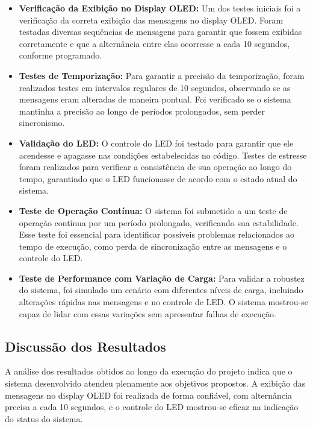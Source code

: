 \documentclass{article}
\begin{document}
\begin{itemize}
    \item \textbf{Verificação da Exibição no Display OLED:} Um dos testes iniciais foi a verificação da correta exibição das mensagens no display OLED. Foram testadas diversas sequências de mensagens para garantir que fossem exibidas corretamente e que a alternância entre elas ocorresse a cada 10 segundos, conforme programado.
    
    \item \textbf{Testes de Temporização:} Para garantir a precisão da temporização, foram realizados testes em intervalos regulares de 10 segundos, observando se as mensagens eram alteradas de maneira pontual. Foi verificado se o sistema mantinha a precisão ao longo de períodos prolongados, sem perder sincronismo.
    
    \item \textbf{Validação do LED:} O controle do LED foi testado para garantir que ele acendesse e apagasse nas condições estabelecidas no código. Testes de estresse foram realizados para verificar a consistência de sua operação ao longo do tempo, garantindo que o LED funcionasse de acordo com o estado atual do sistema.
    
    \item \textbf{Teste de Operação Contínua:} O sistema foi submetido a um teste de operação contínua por um período prolongado, verificando sua estabilidade. Esse teste foi essencial para identificar possíveis problemas relacionados ao tempo de execução, como perda de sincronização entre as mensagens e o controle do LED.
    
    \item \textbf{Teste de Performance com Variação de Carga:} Para validar a robustez do sistema, foi simulado um cenário com diferentes níveis de carga, incluindo alterações rápidas nas mensagens e no controle de LED. O sistema mostrou-se capaz de lidar com essas variações sem apresentar falhas de execução.
\end{itemize}

\subsection{Discussão dos Resultados}

A análise dos resultados obtidos ao longo da execução do projeto indica que o sistema desenvolvido atendeu plenamente aos objetivos propostos. A exibição das mensagens no display OLED foi realizada de forma confiável, com alternância precisa a cada 10 segundos, e o controle do LED mostrou-se eficaz na indicação do status do sistema.
\end{document}
